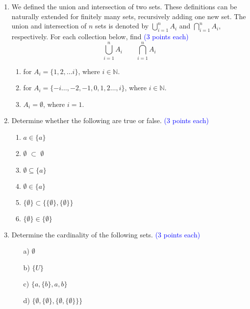 \documentclass{article}
\newcommand{\pte}[1]{\textcolor{blue}{(#1 points each)}}
\begin{document}
\begin{enumerate}
    \item
    We defined the union and intersection of two sets. These definitions can be naturally extended for finitely many sets, recursively adding one new set. The union and intersection of $n$ sets is denoted by $\bigcup_{i = 1}^{n} A_{i}$ and $\bigcap_{i = 1}^{n} A_{i}$, respectively.
    For each collection below, find \pte{3} $$\bigcup_{i = 1}^{n} A_{i} \qquad \bigcap_{i = 1}^{n} A_{i}$$
    \begin{enumerate}
        \item for $A_{i} = \{1, 2, \dots i\}$, where $i \in \mathbb{N}$.
        \item for $A_{i} = \{-i \dots, -2, -1, 0, 1, 2 \dots, i\}$, where $i \in \mathbb{N}$. 
        \item $A_{i} = \emptyset$, where $i = 1$. 
    \end{enumerate}
    
    \item Determine whether the following are true or false. \pte{3}
        \begin{enumerate}
            \item $a \in \{a\}$
            \item $\emptyset$ $\subset$ $\emptyset$
            \item $\emptyset \subseteq \{a\}$ 
            \item $\emptyset \in \{a\}$
            \item $\{\emptyset\} \subset \{\{\emptyset\}, \{\emptyset\}\}$
            \item $\{\emptyset\} \in \{\emptyset\}$
        \end{enumerate}
        
    \item Determine the cardinality of the following sets. \pte{3}
        \begin{enumerate}
            \item[a)] $\emptyset$
            
            \item[b)] $\{U\}$
            
            \item[c)] $\{a,\{b\}, a, b\}$ 
            
            \item[d)] $\{\emptyset,\{\emptyset\},\{\emptyset,\{\emptyset\}\}\}$
        
        \end{enumerate}
        

\end{enumerate}
\end{document}
